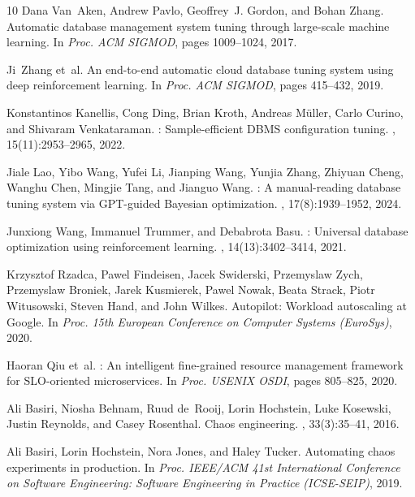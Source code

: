 \documentclass[smallextended]{svjour3}
\begin{document}
\begin{thebibliography}{10}
Dana Van~Aken, Andrew Pavlo, Geoffrey~J. Gordon, and Bohan Zhang.
\newblock Automatic database management system tuning through large-scale
  machine learning.
\newblock In {\em Proc. ACM SIGMOD}, pages 1009--1024, 2017.

Ji~Zhang et~al.
\newblock An end-to-end automatic cloud database tuning system using deep
  reinforcement learning.
\newblock In {\em Proc. ACM SIGMOD}, pages 415--432, 2019.

Konstantinos Kanellis, Cong Ding, Brian Kroth, Andreas M{\"u}ller, Carlo
  Curino, and Shivaram Venkataraman.
: Sample-efficient {DBMS} configuration tuning.
, 15(11):2953--2965, 2022.

Jiale Lao, Yibo Wang, Yufei Li, Jianping Wang, Yunjia Zhang, Zhiyuan Cheng,
  Wanghu Chen, Mingjie Tang, and Jianguo Wang.
: A manual-reading database tuning system via {GPT}-guided
  {Bayesian} optimization.
, 17(8):1939--1952, 2024.

Junxiong Wang, Immanuel Trummer, and Debabrota Basu.
: Universal database optimization using reinforcement learning.
, 14(13):3402--3414, 2021.

Krzysztof Rzadca, Pawel Findeisen, Jacek Swiderski, Przemyslaw Zych, Przemyslaw
  Broniek, Jarek Kusmierek, Pawel Nowak, Beata Strack, Piotr Witusowski, Steven
  Hand, and John Wilkes.
\newblock Autopilot: Workload autoscaling at {Google}.
\newblock In {\em Proc. 15th European Conference on Computer Systems
  (EuroSys)}, 2020.

Haoran Qiu et~al.
: An intelligent fine-grained resource management framework for
  {SLO}-oriented microservices.
\newblock In {\em Proc. USENIX OSDI}, pages 805--825, 2020.

Ali Basiri, Niosha Behnam, Ruud de~Rooij, Lorin Hochstein, Luke Kosewski,
  Justin Reynolds, and Casey Rosenthal.
\newblock Chaos engineering.
, 33(3):35--41, 2016.

Ali Basiri, Lorin Hochstein, Nora Jones, and Haley Tucker.
\newblock Automating chaos experiments in production.
\newblock In {\em Proc. IEEE/ACM 41st International Conference on Software
  Engineering: Software Engineering in Practice (ICSE-SEIP)}, 2019.


\end{thebibliography}
\end{document}
